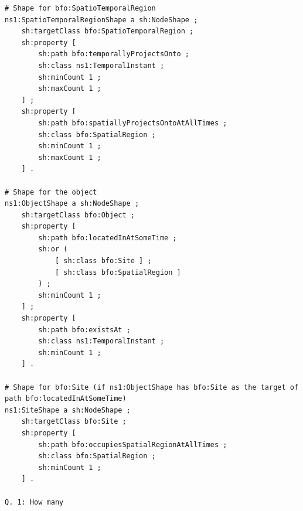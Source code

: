 \begin{verbatim}
# Shape for bfo:SpatioTemporalRegion
ns1:SpatioTemporalRegionShape a sh:NodeShape ;
    sh:targetClass bfo:SpatioTemporalRegion ;
    sh:property [
        sh:path bfo:temporallyProjectsOnto ;
        sh:class ns1:TemporalInstant ;
        sh:minCount 1 ;
        sh:maxCount 1 ;
    ] ;
    sh:property [
        sh:path bfo:spatiallyProjectsOntoAtAllTimes ;
        sh:class bfo:SpatialRegion ;
        sh:minCount 1 ;
        sh:maxCount 1 ;
    ] .

# Shape for the object
ns1:ObjectShape a sh:NodeShape ;
    sh:targetClass bfo:Object ;
    sh:property [
        sh:path bfo:locatedInAtSomeTime ;
        sh:or ( 
            [ sh:class bfo:Site ] ;
            [ sh:class bfo:SpatialRegion ]
        ) ;
        sh:minCount 1 ;
    ] ;
    sh:property [
        sh:path bfo:existsAt ;
        sh:class ns1:TemporalInstant ;
        sh:minCount 1 ;
    ] .

# Shape for bfo:Site (if ns1:ObjectShape has bfo:Site as the target of path bfo:locatedInAtSomeTime)
ns1:SiteShape a sh:NodeShape ;
    sh:targetClass bfo:Site ;
    sh:property [
        sh:path bfo:occupiesSpatialRegionAtAllTimes ;
        sh:class bfo:SpatialRegion ;
        sh:minCount 1 ;
    ] .

Q. 1: How many 
\end{verbatim}